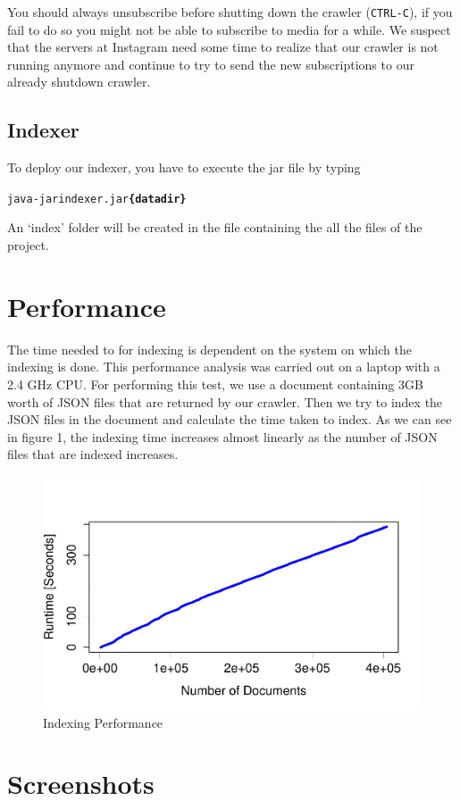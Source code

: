 \documentclass[11pt]{article}
\begin{document}
		You should always unsubscribe before shutting down the crawler (\texttt{CTRL-C}), if you fail to do so you might not be able to subscribe to media for a while. We suspect that the servers at Instagram need some time to realize that our crawler is not running anymore and continue to try to send the new subscriptions to our already shutdown crawler.
	\subsection{Indexer}
		To deploy our indexer, you have to execute the jar file by typing 
		\begin{alltt}
			java -jar indexer.jar \textbf{\{datadir\}}
		\end{alltt}
		An ‘index’ folder will be created in the file containing the all the files of the project.

\section{Performance}
	The time needed to for indexing is dependent on the system on which the indexing is done. This performance analysis was carried out on a laptop with a 2.4 GHz CPU. For performing this test, we use a document containing 3GB worth of JSON files that are returned by our crawler. Then we try to index the JSON files in the document and calculate the time taken to index. As we can see in figure 1, the indexing time increases almost linearly as the number of JSON files that are indexed increases.
	\begin{figure}
		\includegraphics[keepaspectratio, width=\textwidth]{Chart.pdf}
		\caption{Indexing Performance}
		\label{fig:1}
	\end{figure}
\section{Screenshots}
\end{document}
